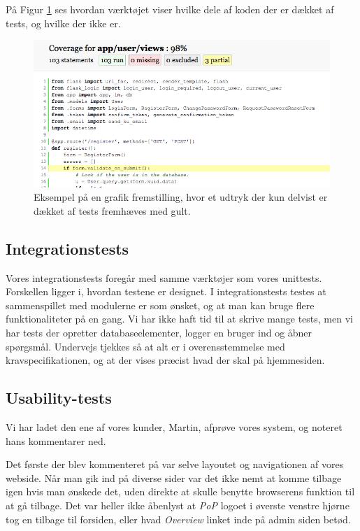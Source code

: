 \documentclass[11pt, a4paper]{article}
\begin{document}
På Figur \ref{fig:code_coverage} ses hvordan værktøjet viser hvilke dele af koden der er dækket af tests, og hvilke der ikke er.

\begin{figure}[h]
    \centering
    \includegraphics[width=1\linewidth]{figures/code_coverage.png}
    \caption{Eksempel på en grafik fremstilling, hvor et udtryk der kun delvist er dækket af tests fremhæves med gult.}
    \label{fig:code_coverage}
\end{figure}

\FloatBarrier

\subsection{Integrationstests}
\label{sub:integrationstests}
Vores integrationstests foregår med samme værktøjer som vores unittests. Forskellen ligger i, hvordan testene er designet. I integrationstests testes at sammenspillet med modulerne er som ønsket, og at man kan bruge flere funktionaliteter på en gang. Vi har ikke haft tid til at skrive mange tests, men vi har tests der opretter databaseelementer, logger en bruger ind og åbner spørgsmål. Undervejs tjekkes så at alt er i overensstemmelse med kravspecifikationen, og at der vises præcist hvad der skal på hjemmesiden.

\subsection{Usability-tests}
\label{sub:usability_tests}
Vi har ladet den ene af vores kunder, Martin, afprøve vores system, og noteret hans kommentarer ned.

Det første der blev kommenteret på var selve layoutet og navigationen af vores webside. Når man gik ind på diverse sider var det ikke nemt at komme tilbage igen hvis man ønskede det, uden direkte at skulle benytte browserens funktion til at gå tilbage. Det var heller ikke åbenlyst at \emph{PoP} logoet i øverste venstre hjørne tog en tilbage til forsiden, eller hvad \emph{Overview} linket inde på admin siden betød.
\end{document}
